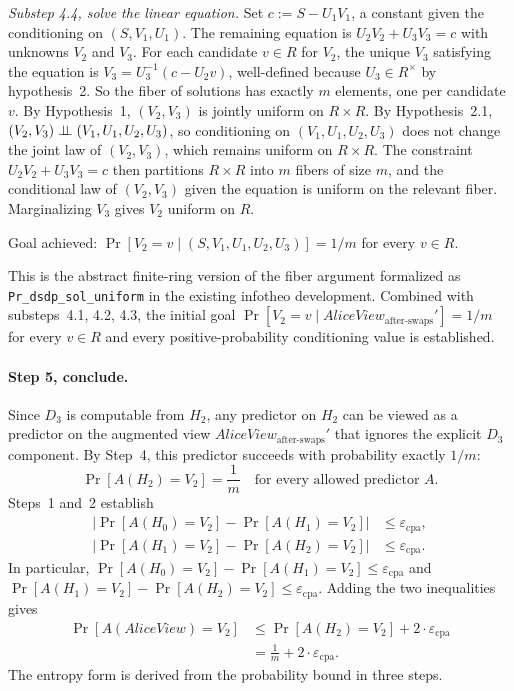 \documentclass[11pt]{article}
\newcommand{\indep}{\mathrel{\perp\mkern-9mu\perp}}
\newcommand{\epscpa}{\varepsilon_{\mathrm{cpa}}}
\newcommand{\AliceView}{\mathit{AliceView}}
\newcommand{\AliceViewHyb}{\mathit{AliceView}_{\textrm{after-swaps}}'}
\begin{document}
\textit{Substep 4.4, solve the linear equation.} Set $c := S - U_1 V_1$, a constant given the conditioning on $(S, V_1, U_1)$. The remaining equation is $U_2 V_2 + U_3 V_3 = c$ with unknowns $V_2$ and $V_3$. For each candidate $v \in R$ for $V_2$, the unique $V_3$ satisfying the equation is $V_3 = U_3^{-1}(c - U_2 v)$, well-defined because $U_3 \in R^\times$ by hypothesis~2. So the fiber of solutions has exactly $m$ elements, one per candidate $v$. By Hypothesis~1, $(V_2, V_3)$ is jointly uniform on $R \times R$. By Hypothesis~2.1, $(V_2, V_3) \indep (V_1, U_1, U_2, U_3)$, so conditioning on $(V_1, U_1, U_2, U_3)$ does not change the joint law of $(V_2, V_3)$, which remains uniform on $R \times R$. The constraint $U_2 V_2 + U_3 V_3 = c$ then partitions $R \times R$ into $m$ fibers of size $m$, and the conditional law of $(V_2, V_3)$ given the equation is uniform on the relevant fiber. Marginalizing $V_3$ gives $V_2$ uniform on $R$.

\quad Goal achieved: $\Pr[V_2 = v \mid (S, V_1, U_1, U_2, U_3)] = 1/m$ for every $v \in R$.

This is the abstract finite-ring version of the fiber argument formalized as \texttt{Pr\_dsdp\_sol\_uniform} in the existing infotheo development. Combined with substeps~4.1, 4.2, 4.3, the initial goal $\Pr[V_2 = v \mid \AliceViewHyb] = 1/m$ for every $v \in R$ and every positive-probability conditioning value is established.

\paragraph{Step 5, conclude.} Since $D_3$ is computable from $H_2$, any predictor on $H_2$ can be viewed as a predictor on the augmented view $\AliceViewHyb$ that ignores the explicit $D_3$ component. By Step~4, this predictor succeeds with probability exactly $1/m$:
\[
\Pr[A(H_2) = V_2] = \frac{1}{m} \quad \text{for every allowed predictor } A.
\]
Steps~1 and~2 establish
\begin{align*}
\big|\Pr[A(H_0)=V_2] - \Pr[A(H_1)=V_2]\big| &\leq \epscpa, \\
\big|\Pr[A(H_1)=V_2] - \Pr[A(H_2)=V_2]\big| &\leq \epscpa.
\end{align*}
In particular, $\Pr[A(H_0)=V_2] - \Pr[A(H_1)=V_2] \leq \epscpa$ and $\Pr[A(H_1)=V_2] - \Pr[A(H_2)=V_2] \leq \epscpa$. Adding the two inequalities gives
\begin{align*}
\Pr[A(\AliceView) = V_2] &\leq \Pr[A(H_2) = V_2] + 2 \cdot \epscpa \\
                          &= \tfrac{1}{m} + 2 \cdot \epscpa.
\end{align*}
The entropy form is derived from the probability bound in three steps.
\end{document}
